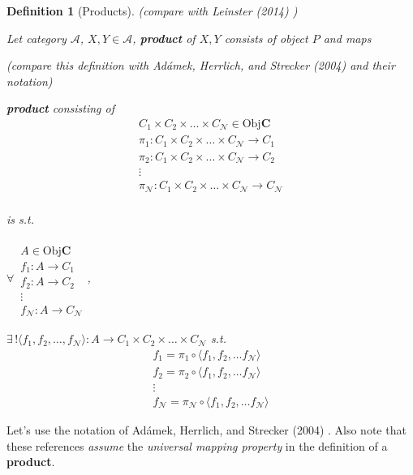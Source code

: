 \documentclass[10pt]{amsart}
\newtheorem{definition}{Definition}
\begin{document}
\begin{multicols*}{2}
\begin{definition}[Products]
	(compare with Leinster (2014) \cite{Lein2014})
	
	Let category $\mathcal{A}$, $X,Y \in \mathcal{A}$, \textbf{product} of $X,Y$ consists of object $P$ and maps
	
	(compare this definition with Ad\'{a}mek, Herrlich, and Strecker (2004) \cite{AHS2004} and their notation)
	
	\textbf{product} consisting of 
	\[
	\begin{aligned}
	C_1 \times C_2 \times \dots \times C_{\mathcal{N}} \in \text{Obj}\mathbf{C} \\
	\pi_1 : C_1 \times C_2 \times \dots \times C_{\mathcal{N}} \to C_1 \\ 
	\pi_2 : C_1 \times C_2 \times \dots \times C_{\mathcal{N}} \to C_2 \\ 
	\vdots \\
	\pi_{\mathcal{N}} : C_1 \times C_2 \times \dots \times C_{\mathcal{N}} \to C_{\mathcal{N}} \\ 
	\end{aligned}
	\]
	
	is s.t. 
	
	$\forall \, \begin{aligned}  \quad \\ 
	A \in \text{Obj}\mathbf{C} \\
	f_1 : A \to C_1 \\
	f_2 : A \to C_2 \\
	\vdots \\
	f_{\mathcal{N}} : A \to C_{\mathcal{N}} \end{aligned}$, 
	
	$\exists \, ! \langle f_1 ,f_2 , \dots , f_{\mathcal{N}} \rangle : A \to C_1 \times C_2 \times \dots \times C_{\mathcal{N}}$ s.t.
	\[
	\begin{aligned}
	f_1 = \pi_1 \circ \langle f_1 , f_2 , \dots f_{\mathcal{N}} \rangle \\ 
	f_2 = \pi_2 \circ \langle f_1 , f_2 , \dots f_{\mathcal{N}} \rangle \\ 
	\vdots  \\ 
	f_{\mathcal{N}} = \pi_{\mathcal{N}} \circ \langle f_1 , f_2 , \dots f_{\mathcal{N}} \rangle 
	\end{aligned}
	\]
\end{definition}

Let's use the notation of Ad\'{a}mek, Herrlich, and Strecker (2004) \cite{AHS2004}. Also note that these references \emph{assume} the \emph{universal mapping property} in the definition of a \textbf{product}.


\end{multicols*}
\end{document}

